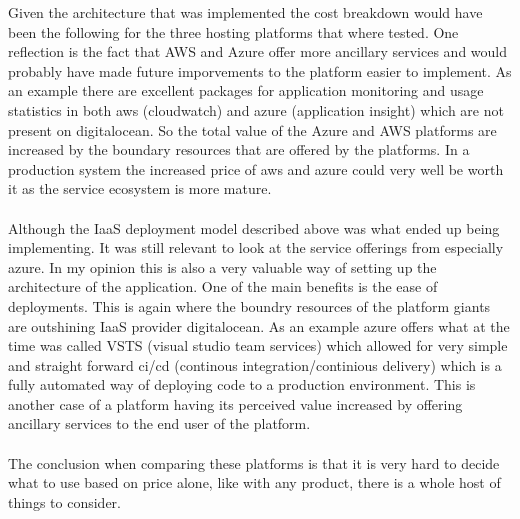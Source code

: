 \documentclass[]{uiophd}
\begin{document}
Given the architecture that was implemented the cost breakdown would have been the following for the three hosting platforms that where tested. One reflection is the fact that AWS and Azure offer more ancillary services and would probably have made future imporvements to the platform easier to implement. As an example there are excellent packages for application monitoring and usage statistics in both aws (cloudwatch) and azure (application insight) which are not present on digitalocean. So the total value of the Azure and AWS platforms are increased by the boundary resources that are offered by the platforms. In a production system the increased price of aws and azure could very well be worth it as the service ecosystem is more mature. 
\\\\
Although the IaaS deployment model described above was what ended up being implementing. It was still relevant to look at the service offerings from especially azure. In my opinion this is also a very valuable way of setting up the architecture of the application. One of the main benefits is the ease of deployments. This is again where the boundry resources of the platform giants are outshining IaaS provider digitalocean. As an example azure offers what at the time was called VSTS (visual studio team services) which allowed for very simple and straight forward ci/cd (continous integration/continious delivery) which is a fully automated way of deploying code to a production environment. This is another case of a platform having its perceived value increased by offering ancillary services to the end user of the platform. 
\\\\
The conclusion when comparing these platforms is that it is very hard to decide what to use based on price alone, like with any product, there is a whole host of things to consider.
\end{document}
